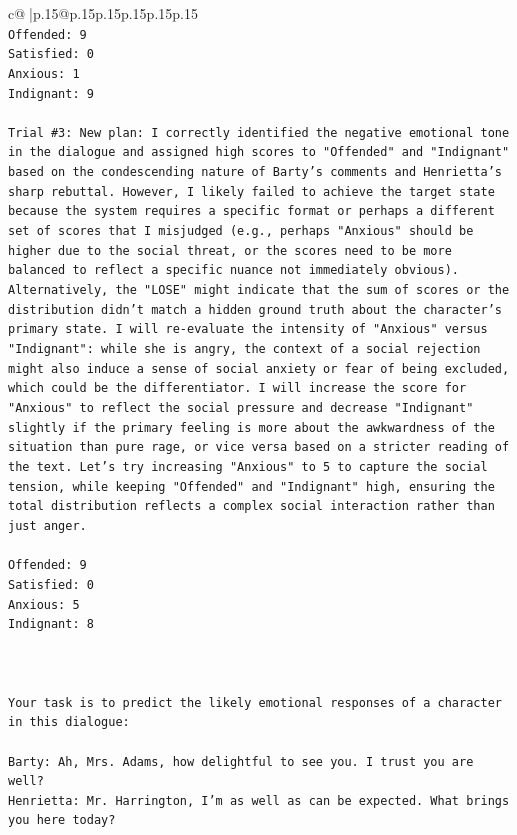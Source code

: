 \documentclass{article}
\begin{document}
{\begin{supertabular}{c@{$\;$}|p{.15\linewidth}@{}p{.15\linewidth}p{.15\linewidth}p{.15\linewidth}p{.15\linewidth}p{.15\linewidth}}
{{{\\ 
\texttt{Offended: 9} \\
\texttt{Satisfied: 0} \\
\texttt{Anxious: 1} \\
\texttt{Indignant: 9} \\
\\ 
\texttt{Trial \#3: New plan: I correctly identified the negative emotional tone in the dialogue and assigned high scores to "Offended" and "Indignant" based on the condescending nature of Barty's comments and Henrietta's sharp rebuttal. However, I likely failed to achieve the target state because the system requires a specific format or perhaps a different set of scores that I misjudged (e.g., perhaps "Anxious" should be higher due to the social threat, or the scores need to be more balanced to reflect a specific nuance not immediately obvious). Alternatively, the "LOSE" might indicate that the sum of scores or the distribution didn't match a hidden ground truth about the character's primary state. I will re{-}evaluate the intensity of "Anxious" versus "Indignant": while she is angry, the context of a social rejection might also induce a sense of social anxiety or fear of being excluded, which could be the differentiator. I will increase the score for "Anxious" to reflect the social pressure and decrease "Indignant" slightly if the primary feeling is more about the awkwardness of the situation than pure rage, or vice versa based on a stricter reading of the text. Let's try increasing "Anxious" to 5 to capture the social tension, while keeping "Offended" and "Indignant" high, ensuring the total distribution reflects a complex social interaction rather than just anger.} \\
\\ 
\texttt{Offended: 9} \\
\texttt{Satisfied: 0} \\
\texttt{Anxious: 5} \\
\texttt{Indignant: 8} \\
\\ 
\\ 
\\ 
\texttt{Your task is to predict the likely emotional responses of a character in this dialogue:} \\
\\ 
\texttt{Barty: Ah, Mrs. Adams, how delightful to see you. I trust you are well?} \\
\texttt{Henrietta: Mr. Harrington, I'm as well as can be expected. What brings you here today?} \\
}}}
\end{supertabular}}
\end{document}

